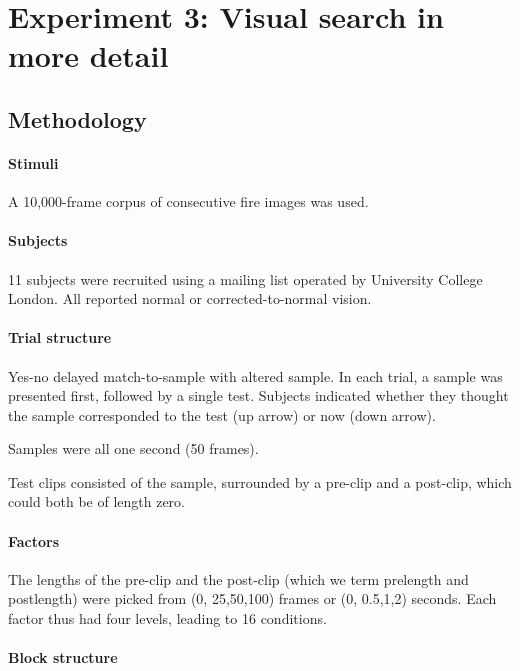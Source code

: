 \section{Experiment 3: Visual search in more detail}

\subsection{Methodology}

\paragraph{Stimuli}

A 10,000-frame corpus of consecutive fire images was used.



\paragraph{Subjects}

11 subjects were recruited using a mailing list operated by University College London. All reported normal or corrected-to-normal vision.

\paragraph{Trial structure}

Yes-no delayed match-to-sample with altered sample.
In each trial, a sample was presented first, followed by a single test. Subjects indicated whether they thought the sample corresponded to the test (up arrow) or now (down arrow).

Samples were all one second (50 frames).

Test clips consisted of the sample, surrounded by a pre-clip and a post-clip, which could both be of length zero.



\paragraph{Factors}

The lengths of the pre-clip and the post-clip (which we term prelength and postlength) were picked from (0, 25,50,100) frames or (0, 0.5,1,2) seconds. Each factor thus had four levels, leading to 16 conditions.

\paragraph{Block structure}

